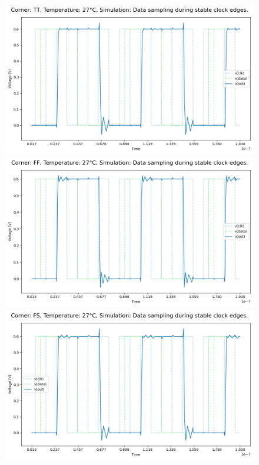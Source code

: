 \begin{figure}[H]
    \centering
    \includegraphics[height= 0.21\textheight]{figures/aimspice/TT/27/W3.csv.png}
    \vspace{5pt}
    \includegraphics[height= 0.21\textheight]{figures/aimspice/FF/27/W3.csv.png}
    \vspace{5pt}
    \includegraphics[height= 0.21\textheight]{figures/aimspice/FS/27/W3.csv.png}

\end{figure}

